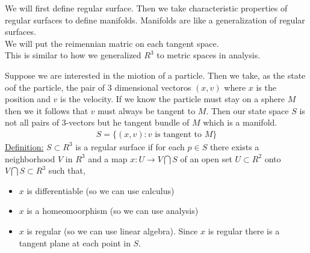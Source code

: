 \documentclass[12pt,letterpaper]{hmcpset}
\begin{document}
We will first define regular surface. Then we take characteristic properties of
regular surfaces to define manifolds. Manifolds are like a generalization of
regular surfaces. \\
We will put the reimennian matric on each tangent space. \\

This is similar to how we generalized $R^3$ to metric spaces in analysis.

Suppose we are interested in the miotion of a particle. Then we take, as the
state oof the particle, the pair of 3 dimensional vectoros $(x, v)$ where $x$ is
the position and $v$ is the velocity. If we know the particle must stay on a
sphere $M$ then we it follows that $v$ must always be tangent to $M$. Then our
state space $S$ is not all pairs of 3-vectors but he tangent bundle of $M$ which
is a manifold.
\begin{align*}
  S = \{ (x, v) : v\text{ is tangent to }M\}
\end{align*}
\underline{Definition:} $S \subset R^3$ is a regular surface if for each $p \in S$ there
exists a neighborhood $V$ in $R^3$ and a map $x: U \rightarrow V \bigcap S$ of an open set $U
\subset R^2$ onto $V \bigcap S \subset R^3$ such that,
\begin{itemize}
\item $x$ is differentiable (so we can use calculus)
\item $x$ is a homeomoorphism (so we can use analysis)
\item $x$ is regular (so we can use linear algebra). Since $x$ is regular there
  is a tangent plane at each point in $S$.
\end{itemize}
\end{document}
